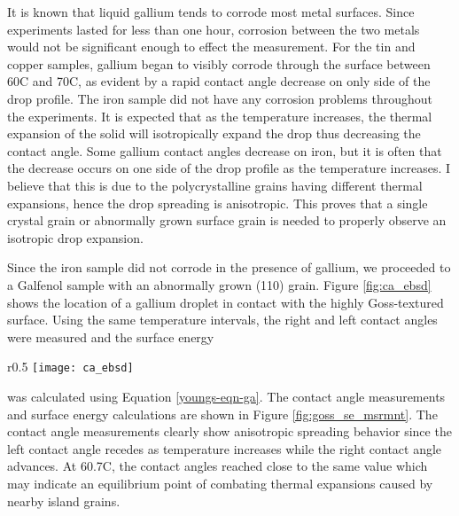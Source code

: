 It is known that liquid gallium tends to corrode most metal surfaces.\cite{Lewandowski2015,Narh1998,Fitzgerald1999} Since experiments lasted for less than one hour, corrosion between the two metals would not be significant enough to effect the measurement. For the tin and copper samples, gallium began to visibly corrode through the surface between 60\degree C and 70\degree C, as evident by a rapid contact angle decrease on only side of the drop profile. The iron sample did not have any corrosion problems throughout the experiments. It is expected that as the temperature increases, the thermal expansion of the solid will isotropically expand the drop thus decreasing the contact angle. Some gallium contact angles decrease on iron, but it is often that the decrease occurs on one side of the drop profile as the temperature increases. I believe that this is due to the polycrystalline grains having different thermal expansions, hence the drop spreading is anisotropic. This proves that a single crystal grain or abnormally grown surface grain is needed to properly observe an isotropic drop expansion. 


Since the iron sample did not corrode in the presence of gallium, we proceeded to a Galfenol sample with an abnormally grown \hkl(110) grain. Figure \ref{fig:ca_ebsd} shows the location of a gallium droplet in contact with the highly Goss-textured surface. Using the same temperature intervals, the right and left contact angles were measured and the surface energy
\begin{wrapfigure}[8]{r}{0.5\linewidth}
	\centering
	\texttt{[image: ca\_ebsd]}
	\caption{The location of a gallium drop on highly Goss-textured surface.}
	\label{fig:ca_ebsd}
\end{wrapfigure}
 was calculated using Equation \ref{youngs-eqn-ga}. The contact angle measurements and surface energy calculations are shown in Figure \ref{fig:goss_se_msrmnt}. The contact angle measurements clearly show anisotropic spreading behavior since the left contact angle recedes as temperature increases while the right contact angle advances. At 60.7\degree C, the contact angles reached close to the same value which may indicate an equilibrium point of combating thermal expansions caused by nearby island grains. 

